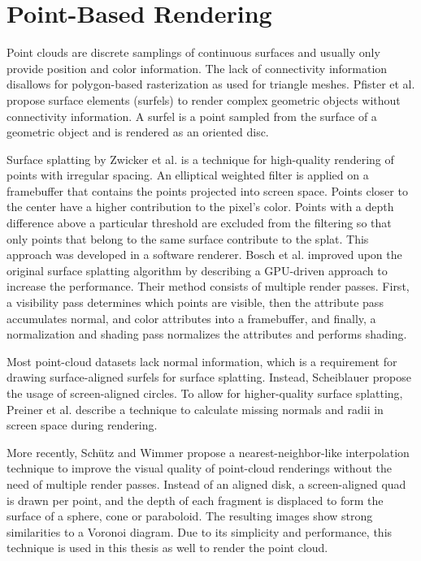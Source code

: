 \section{Point-Based Rendering}
\label{sec:related_work_point_rendering}
Point clouds are discrete samplings of continuous surfaces and usually only provide position and color information. The lack of connectivity information disallows for polygon-based rasterization as used for triangle meshes. Pfister et al. \cite{pfister2000surfels} propose surface elements (surfels) to render complex geometric objects without connectivity information. A surfel is a point sampled from the surface of a geometric object and is rendered as an oriented disc. 

\par

Surface splatting by Zwicker et al. \cite{zwicker2001surface} is a technique for high-quality rendering of points with irregular spacing. An elliptical weighted filter is applied on a framebuffer that contains the points projected into screen space. Points closer to the center have a higher contribution to the pixel's color. Points with a depth difference above a particular threshold are excluded from the filtering so that only points that belong to the same surface contribute to the splat. This approach was developed in a software renderer. Bosch et al. \cite{botsch2005high} improved upon the original surface splatting algorithm by describing a GPU-driven approach to increase the performance. Their method consists of multiple render passes. First, a visibility pass determines which points are visible, then the attribute pass accumulates normal, and color attributes into a framebuffer, and finally, a normalization and shading pass normalizes the attributes and performs shading. 

\par

Most point-cloud datasets lack normal information, which is a requirement for drawing surface-aligned surfels for surface splatting. Instead, Scheiblauer \cite{scheiblauer2011consolidated} propose the usage of screen-aligned circles. To allow for higher-quality surface splatting, Preiner et al. \cite{preiner2012auto} describe a technique to calculate missing normals and radii in screen space during rendering. 

\par

More recently, Schütz and Wimmer \cite{schutz2015high} propose a nearest-neighbor-like interpolation technique to improve the visual quality of point-cloud renderings without the need of multiple render passes. Instead of an aligned disk, a screen-aligned quad is drawn per point, and the depth of each fragment is displaced to form the surface of a sphere, cone or paraboloid. The resulting images show strong similarities to a Voronoi diagram. Due to its simplicity and performance, this technique is used in this thesis as well to render the point cloud. 
